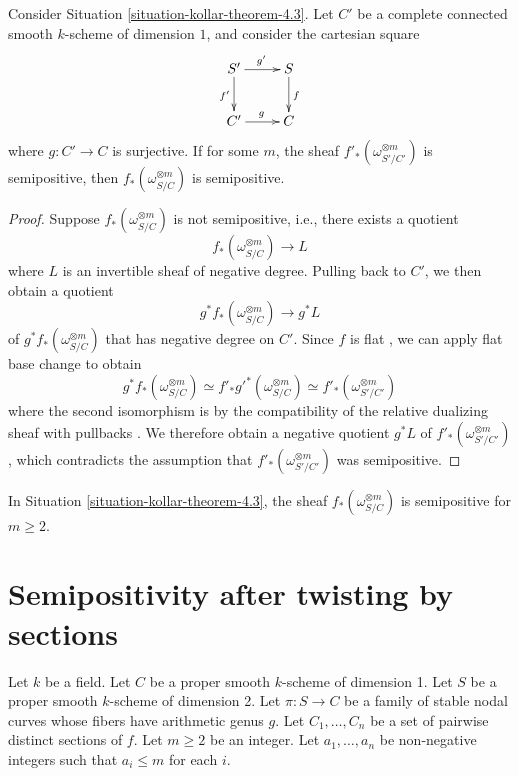 \begin{lemma}
\label{lemma-base-change-okay}
Consider Situation \ref{situation-kollar-theorem-4.3}.
Let $C'$ be a complete connected smooth $k$-scheme of dimension $1$, and
consider the cartesian square
$$
\xymatrix{
S' \ar[d]_{f'}\ar[r]^{g'} & S\ar[d]^f\\
C' \ar[r]^g & C
}
$$
where $g: C' \to C$ is surjective.
If for some $m$, the sheaf $f'_*(\omega_{S'/C'}^{\otimes m})$ is semipositive,
then $f_*(\omega_{S/C}^{\otimes m})$ is semipositive.
\end{lemma}
\begin{proof}
Suppose $f_*(\omega_{S/C}^{\otimes m})$ is not semipositive, i.e., there
exists a quotient
$$f_*(\omega_{S/C}^{\otimes m}) \longrightarrow L$$
where $L$ is an invertible sheaf of negative degree.
Pulling back to $C'$, we then obtain a quotient
$$g^*f_*(\omega_{S/C}^{\otimes m}) \longrightarrow g^*L$$
of $g^*f_*(\omega_{S/C}^{\otimes m})$ that has negative degree on $C'$.
Since $f$ is flat \cite[\href{http://stacks.math.columbia.edu/tag/00R4}{Tag
00R4}]{stacks-project}, we can apply flat base change
\cite[\href{http://stacks.math.columbia.edu/tag/02KH}{Tag 02KH}]{stacks-project}
to obtain
$$
g^*f_*(\omega_{S/C}^{\otimes m})
\simeq f'_*g'^*(\omega_{S/C}^{\otimes m})
\simeq f'_*(\omega_{S'/C'}^{\otimes m})
$$
where the second isomorphism is
by the compatibility of the relative dualizing sheaf with pullbacks
\cite[\href{http://stacks.math.columbia.edu/tag/0E4P}{Tag
0E4P}]{stacks-project}.
We therefore obtain a negative quotient $g^*L$ of $f'_*(\omega_{S'/C'}^{\otimes
m})$, which contradicts the assumption that $f'_*(\omega_{S'/C'}^{\otimes m})$
was semipositive.
\end{proof}

\begin{theorem}[cf.\ {\cite[Theorem 4.3]{Ko90}}]
\label{theorem-kollar-theorem-4.3}
In Situation \ref{situation-kollar-theorem-4.3}, 
the sheaf $f_*(\omega_{S/C}^{\otimes m})$ is semipositive for $m \ge 2$. 
\end{theorem}








\section{Semipositivity after twisting by sections}

\begin{situation}\label{kollar_prop_4.7}
Let $k$ be a field.
Let $C$ be a proper smooth $k$-scheme of dimension 1.
Let $S$ be a proper smooth $k$-scheme of dimension 2.
Let $\pi:S\to C$ be a family of stable nodal curves whose fibers have arithmetic genus $g$.
Let $C_1,\ldots,C_n$ be a set of pairwise distinct sections of $f$.
Let $m\ge2$ be an integer.
Let $a_1,\ldots,a_n$ be non-negative integers such that $a_i\le m$ for each $i$.
\end{situation}

